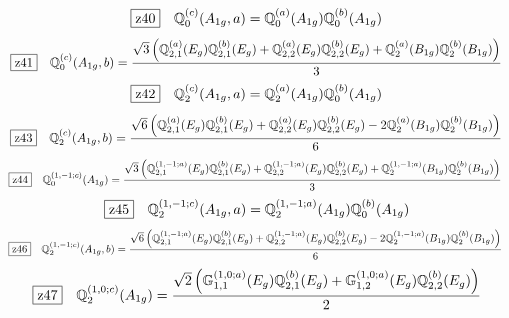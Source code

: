 \documentclass[fleqn,10pt,landscape]{jsarticle}
\begin{document}
\begin{dmath*}
\hspace*{3mm}\fbox{z40}\quad \mathbb{Q}_{0}^{(c)}(A_{1g},a)=\mathbb{Q}_{0}^{(a)}(A_{1g}) \mathbb{Q}_{0}^{(b)}(A_{1g})
\end{dmath*}
\begin{dmath*}
\hspace*{3mm}\fbox{z41}\quad \mathbb{Q}_{0}^{(c)}(A_{1g},b)=\frac{\sqrt{3} \left(\mathbb{Q}_{2,1}^{(a)}(E_{g}) \mathbb{Q}_{2,1}^{(b)}(E_{g}) + \mathbb{Q}_{2,2}^{(a)}(E_{g}) \mathbb{Q}_{2,2}^{(b)}(E_{g}) + \mathbb{Q}_{2}^{(a)}(B_{1g}) \mathbb{Q}_{2}^{(b)}(B_{1g})\right)}{3}
\end{dmath*}
\begin{dmath*}
\hspace*{3mm}\fbox{z42}\quad \mathbb{Q}_{2}^{(c)}(A_{1g},a)=\mathbb{Q}_{2}^{(a)}(A_{1g}) \mathbb{Q}_{0}^{(b)}(A_{1g})
\end{dmath*}
\begin{dmath*}
\hspace*{3mm}\fbox{z43}\quad \mathbb{Q}_{2}^{(c)}(A_{1g},b)=\frac{\sqrt{6} \left(\mathbb{Q}_{2,1}^{(a)}(E_{g}) \mathbb{Q}_{2,1}^{(b)}(E_{g}) + \mathbb{Q}_{2,2}^{(a)}(E_{g}) \mathbb{Q}_{2,2}^{(b)}(E_{g}) - 2 \mathbb{Q}_{2}^{(a)}(B_{1g}) \mathbb{Q}_{2}^{(b)}(B_{1g})\right)}{6}
\end{dmath*}
\begin{dmath*}
\hspace*{3mm}\fbox{z44}\quad \mathbb{Q}_{0}^{(1,-1;c)}(A_{1g})=\frac{\sqrt{3} \left(\mathbb{Q}_{2,1}^{(1,-1;a)}(E_{g}) \mathbb{Q}_{2,1}^{(b)}(E_{g}) + \mathbb{Q}_{2,2}^{(1,-1;a)}(E_{g}) \mathbb{Q}_{2,2}^{(b)}(E_{g}) + \mathbb{Q}_{2}^{(1,-1;a)}(B_{1g}) \mathbb{Q}_{2}^{(b)}(B_{1g})\right)}{3}
\end{dmath*}
\begin{dmath*}
\hspace*{3mm}\fbox{z45}\quad \mathbb{Q}_{2}^{(1,-1;c)}(A_{1g},a)=\mathbb{Q}_{2}^{(1,-1;a)}(A_{1g}) \mathbb{Q}_{0}^{(b)}(A_{1g})
\end{dmath*}
\begin{dmath*}
\hspace*{3mm}\fbox{z46}\quad \mathbb{Q}_{2}^{(1,-1;c)}(A_{1g},b)=\frac{\sqrt{6} \left(\mathbb{Q}_{2,1}^{(1,-1;a)}(E_{g}) \mathbb{Q}_{2,1}^{(b)}(E_{g}) + \mathbb{Q}_{2,2}^{(1,-1;a)}(E_{g}) \mathbb{Q}_{2,2}^{(b)}(E_{g}) - 2 \mathbb{Q}_{2}^{(1,-1;a)}(B_{1g}) \mathbb{Q}_{2}^{(b)}(B_{1g})\right)}{6}
\end{dmath*}
\begin{dmath*}
\hspace*{3mm}\fbox{z47}\quad \mathbb{Q}_{2}^{(1,0;c)}(A_{1g})=\frac{\sqrt{2} \left(\mathbb{G}_{1,1}^{(1,0;a)}(E_{g}) \mathbb{Q}_{2,1}^{(b)}(E_{g}) + \mathbb{G}_{1,2}^{(1,0;a)}(E_{g}) \mathbb{Q}_{2,2}^{(b)}(E_{g})\right)}{2}
\end{dmath*}
\end{document}
